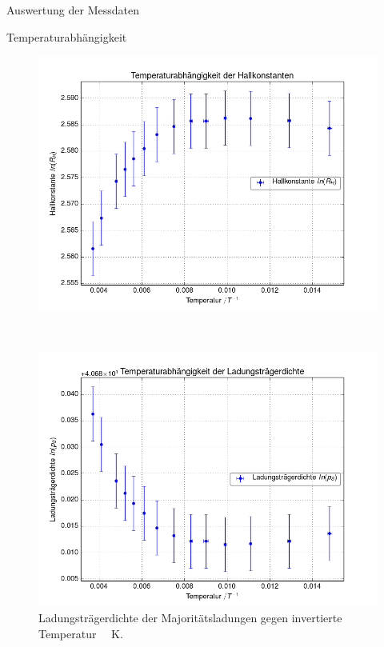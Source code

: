 \documentclass[pdftex, a4paper,11pt, twoside, ngerman]{report}
\begin{document}
\begin{chapter}{Auswertung der Messdaten}
\begin{section}{Temperaturabhängigkeit}
      \begin{figure}[p]
        \centering
        \begin{minipage}{.92\textwidth}
          \centering
          \includegraphics[width=\textwidth]{Figures/Temp_Hallkonstante.png}
          \caption{Hallkonstante gegen invertierte Temperatur
              \SI{}{\per\kelvin}.}
          \label{fig:TempHallkonstante}
        \end{minipage}\\
        \begin{minipage}{.92\textwidth}
          \centering
          \includegraphics[width=\textwidth]{Figures/Temp_Ladungsdichte.png}
          \caption{Ladungsträgerdichte der Majoritätsladungen gegen invertierte
              Temperatur \SI{}{\per\kelvin}.}
          \label{fig:TempLadungsdichte}
        \end{minipage}
      \end{figure}
      

\end{section}
\end{chapter}
\end{document}
